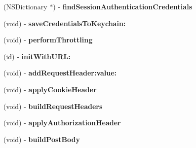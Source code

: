 \begin{DoxyCompactItemize}
\item 
\hypertarget{interface_a_s_i_h_t_t_p_request_a0f38ffc0ae199e83262895f640c9c263}{
(\-N\-S\-Dictionary $\ast$) -\/ {\bfseries find\-Session\-Authentication\-Credentials}}
\label{interface_a_s_i_h_t_t_p_request_a0f38ffc0ae199e83262895f640c9c263}

\item 
\hypertarget{interface_a_s_i_h_t_t_p_request_a3a57684f5aba49781ec3c9c9ef1516a6}{
(void) -\/ {\bfseries save\-Credentials\-To\-Keychain\-:}}
\label{interface_a_s_i_h_t_t_p_request_a3a57684f5aba49781ec3c9c9ef1516a6}

\item 
\hypertarget{interface_a_s_i_h_t_t_p_request_a510b47cc1be0b9c1968a9c8cc3859038}{
(void) -\/ {\bfseries perform\-Throttling}}
\label{interface_a_s_i_h_t_t_p_request_a510b47cc1be0b9c1968a9c8cc3859038}

\item 
\hypertarget{interface_a_s_i_h_t_t_p_request_aec75eeba26544a9da35e795011fe4a42}{
(id) -\/ {\bfseries init\-With\-U\-R\-L\-:}}
\label{interface_a_s_i_h_t_t_p_request_aec75eeba26544a9da35e795011fe4a42}

\item 
\hypertarget{interface_a_s_i_h_t_t_p_request_a0e969f091acb07bbbe6dbc9295260d64}{
(void) -\/ {\bfseries add\-Request\-Header\-:value\-:}}
\label{interface_a_s_i_h_t_t_p_request_a0e969f091acb07bbbe6dbc9295260d64}

\item 
\hypertarget{interface_a_s_i_h_t_t_p_request_a96645d25afb711168d8722089ad0da60}{
(void) -\/ {\bfseries apply\-Cookie\-Header}}
\label{interface_a_s_i_h_t_t_p_request_a96645d25afb711168d8722089ad0da60}

\item 
\hypertarget{interface_a_s_i_h_t_t_p_request_a84fd344945df932bb1499066a6136b44}{
(void) -\/ {\bfseries build\-Request\-Headers}}
\label{interface_a_s_i_h_t_t_p_request_a84fd344945df932bb1499066a6136b44}

\item 
\hypertarget{interface_a_s_i_h_t_t_p_request_a585f10faa599a2d9c27a5013653901e8}{
(void) -\/ {\bfseries apply\-Authorization\-Header}}
\label{interface_a_s_i_h_t_t_p_request_a585f10faa599a2d9c27a5013653901e8}

\item 
\hypertarget{interface_a_s_i_h_t_t_p_request_a03e252428a7cee3ce6c67a33d93adfb4}{
(void) -\/ {\bfseries build\-Post\-Body}}
\label{interface_a_s_i_h_t_t_p_request_a03e252428a7cee3ce6c67a33d93adfb4}


\end{DoxyCompactItemize}

